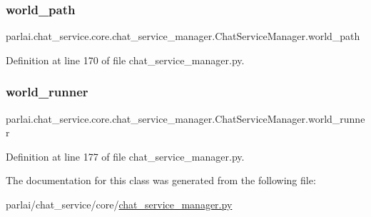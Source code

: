 \subsubsection{\texorpdfstring{world\+\_\+path}{world\_path}}
{\footnotesize\ttfamily parlai.\+chat\+\_\+service.\+core.\+chat\+\_\+service\+\_\+manager.\+Chat\+Service\+Manager.\+world\+\_\+path}



Definition at line 170 of file chat\+\_\+service\+\_\+manager.\+py.

\mbox{\label{classparlai_1_1chat__service_1_1core_1_1chat__service__manager_1_1ChatServiceManager_aa0d3b75513f393394d5ca548f7b99352}} 
\subsubsection{\texorpdfstring{world\+\_\+runner}{world\_runner}}
{\footnotesize\ttfamily parlai.\+chat\+\_\+service.\+core.\+chat\+\_\+service\+\_\+manager.\+Chat\+Service\+Manager.\+world\+\_\+runner}



Definition at line 177 of file chat\+\_\+service\+\_\+manager.\+py.



The documentation for this class was generated from the following file\+:\begin{DoxyCompactItemize}
\item 
parlai/chat\+\_\+service/core/\hyperlink{chat__service__manager_8py}{chat\+\_\+service\+\_\+manager.\+py}\end{DoxyCompactItemize}
